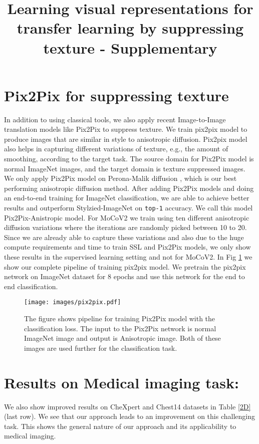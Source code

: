 \documentclass{bmvc2k}
\title{Learning visual representations for transfer learning by suppressing texture - Supplementary}
\begin{document}
\maketitle


\section{Pix2Pix for suppressing texture}
In addition to using classical tools, we also apply recent Image-to-Image translation models like Pix2Pix \cite{isola2018imagetoimage} to suppress texture. We train pix2pix model to produce images that are similar in style to anisotropic diffusion. Pix2pix model also helps in capturing different variations of texture, e.g., the amount of smoothing,  according to the target task. The source domain for Pix2Pix model is normal ImageNet images, and the target domain is texture suppressed images. We only apply Pix2Pix model on Perona-Malik diffusion \cite{Perona1990ScaleSpaceAE}, which is our best performing anisotropic diffusion method. After adding Pix2Pix models and doing an end-to-end training for ImageNet classification, we are able to achieve better results and outperform Stylzied-ImageNet on \texttt{top-1} accuracy. We call this model  Pix2Pix-Anistropic model. For MoCoV2 we train using ten different anisotropic diffusion variations where the iterations are randomly picked between 10 to 20. Since we are already able to capture these variations and also due to the huge compute requirements and time to train SSL and Pix2Pix models, we only show these results in the supervised learning setting and not for MoCoV2. 
In Fig \ref{fig:pix2pix} we show our complete pipeline of training pix2pix model. We pretrain the pix2pix network on ImageNet dataset for 8 epochs and use this network for the end to end classification.

\begin{figure}[h]
\texttt{[image: images/pix2pix.pdf]}
\caption{The figure shows pipeline for training Pix2Pix model with the classification loss. The input to the Pix2Pix network is normal ImageNet image and output is Anisotropic image. Both of these images are used further for the classification task. }
\label{fig:pix2pix}
\end{figure}

\section{Results on Medical imaging task:}
We also show  improved results on CheXpert and Chest14 datasets in Table \ref{2D} (last row). We see that our approach leads to an improvement on this challenging task. This shows the general nature of our approach and its applicability to medical imaging.
\end{document}
